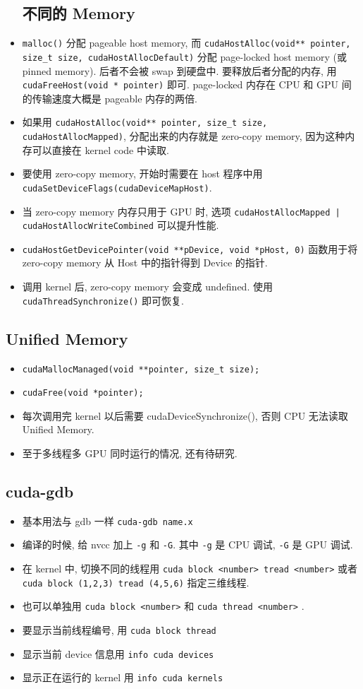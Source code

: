 \begin{itemize}
\subsection{不同的 Memory}
\item \verb`malloc()` 分配 pageable host memory, 而 \verb`cudaHostAlloc(void** pointer, size_t size, cudaHostAllocDefault)` 分配 page-locked host memory (或 pinned memory). 后者不会被 swap 到硬盘中. 要释放后者分配的内存, 用 \verb`cudaFreeHost(void * pointer)` 即可. page-locked 内存在 CPU 和 GPU 间的传输速度大概是 pageable 内存的两倍.
\item 如果用 \verb`cudaHostAlloc(void** pointer, size_t size, cudaHostAllocMapped)`, 分配出来的内存就是 zero-copy memory, 因为这种内存可以直接在 kernel code 中读取.
\item 要使用 zero-copy memory, 开始时需要在 host 程序中用 \verb`cudaSetDeviceFlags(cudaDeviceMapHost)`.
\item 当 zero-copy memory 内存只用于 GPU 时, 选项 \verb`cudaHostAllocMapped | cudaHostAllocWriteCombined` 可以提升性能.
\item \verb`cudaHostGetDevicePointer(void **pDevice, void *pHost, 0)` 函数用于将 zero-copy memory 从 Host 中的指针得到 Device 的指针.
\item 调用 kernel 后, zero-copy memory 会变成 undefined. 使用 \verb`cudaThreadSynchronize()` 即可恢复.
\end{itemize}

\subsection{Unified Memory}
\begin{itemize}
\item \verb|cudaMallocManaged(void **pointer, size_t size);|
\item \verb|cudaFree(void *pointer);|
\item 每次调用完 kernel 以后需要 cudaDeviceSynchronize(), 否则 CPU 无法读取 Unified Memory.
\item 至于多线程多 GPU 同时运行的情况, 还有待研究.
\end{itemize}

\subsection{cuda-gdb}
\begin{itemize}
\item 基本用法与 gdb 一样 \verb|cuda-gdb name.x|
\item 编译的时候, 给 nvcc 加上 \verb`-g` 和 \verb`-G`. 其中 \verb`-g` 是 CPU 调试, \verb`-G` 是 GPU 调试.
\item 在 kernel 中, 切换不同的线程用
\verb`cuda block <number> tread <number>` 或者 \verb`cuda block (1,2,3) tread (4,5,6)` 指定三维线程.
\item 也可以单独用 \verb`cuda block <number>` 和 \verb`cuda thread <number>` .
\item 要显示当前线程编号, 用 \verb`cuda block thread`
\item 显示当前 device 信息用 \verb`info cuda devices`
\item 显示正在运行的 kernel 用 \verb`info cuda kernels`
\end{itemize}

